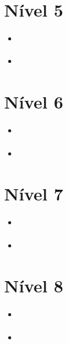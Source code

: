 \section{Nível 5}

\begin{itemize}
\item \url{}
\item \url{}
\end{itemize}



\section{Nível 6}

\begin{itemize}
\item \url{}
\item \url{}
\end{itemize}



\section{Nível 7}

\begin{itemize}
\item \url{}
\item \url{}
\end{itemize}



\section{Nível 8}


\begin{itemize}
\item \url{}
\item \url{}
\end{itemize}


